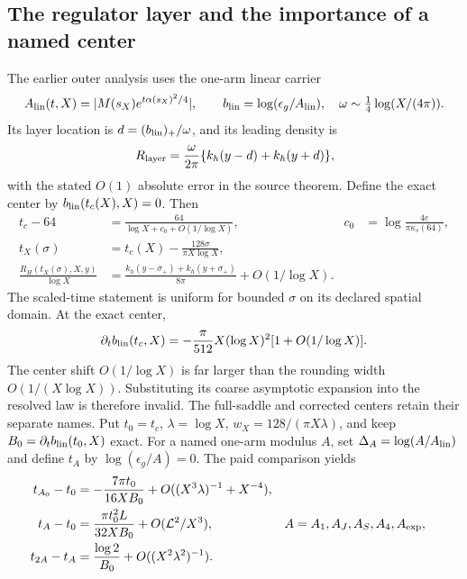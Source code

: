 \subsection{The regulator layer and the importance of a named center}
The earlier outer analysis uses the one-arm linear carrier
\[
 A_{\rm lin}(t,X)=|M(s_X)e^{t\alpha(s_X)^2/4}|,
 \qquad b_{\rm lin}=\log(\epsilon_g/A_{\rm lin}),\quad
 \omega\sim\tfrac14\log(X/(4\pi)).
\]
Its layer location is $d=(b_{\rm lin})_+/\omega$, and its leading
density is
\begin{equation}
 R_{\rm layer}=\frac{\omega}{2\pi}
                       \{k_h(y-d)+k_h(y+d)\},
 \label{eq:layer}
\end{equation}
with the stated $O(1)$ absolute error in the source theorem. Define
the exact center by $b_{\rm lin}(t_c(X),X)=0$. Then
\begin{align}
 t_c-64&=\frac{64}{\log X+c_0+O(1/\log X)},
 &c_0&=\log\frac{4e}{\pi\kappa_s(64)},\\
 t_X(\sigma)&=t_c(X)-\frac{128\sigma}{\pi X\log X},\\
 \frac{R_H(t_X(\sigma),X,y)}{\log X}
 &=\frac{k_h(y-\sigma_+)+k_h(y+\sigma_+)}{8\pi}
                           +O(1/\log X).
 \label{eq:resolved-layer}
\end{align}
The scaled-time statement is uniform for bounded $\sigma$ on its
declared spatial domain. At the exact center,
\begin{equation}
 \partial_t b_{\rm lin}(t_c,X)
   =-\frac\pi{512}X(\log X)^2[1+O(1/\log X)].
 \label{eq:center-sensitivity}
\end{equation}
The center shift $O(1/\log X)$ is far larger than the rounding width
$O(1/(X\log X))$. Substituting its coarse asymptotic expansion into
the resolved law is therefore invalid. The full-saddle and corrected centers retain their separate names.
Put $t_0=t_c$, $\lambda=\log X$, $w_X=128/(\pi X\lambda)$,
and keep $B_0=\partial_t b_{\rm lin}(t_0,X)$ exact. For a named one-arm
modulus $A$, set $\Delta_A=\log(A/A_{\rm lin})$ and define $t_A$ by
$\log(\epsilon_g/A)=0$. The paid comparison yields \cite{centers}
\begin{align}
 t_{A_0}-t_0&=-\frac{7\pi t_0}{16XB_0}
                  +O((X^3\lambda)^{-1}+X^{-4}),\notag\\
 t_A-t_0&=\frac{\pi t_0^2L}{32XB_0}+O(\mathcal L^2/X^3),
                    && A=A_1,A_J,A_S,A_4,A_{\exp},\label{eq:named-centres}\\
 t_{2A}-t_A&=\frac{\log2}{B_0}+O((X^2\lambda^2)^{-1}).\notag
\end{align}
